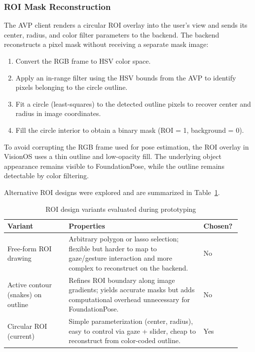 \subsubsection{ROI Mask Reconstruction}

The AVP client renders a circular ROI overlay into the user’s view and sends its center, radius, and color filter parameters to the backend. The backend reconstructs a pixel mask without receiving a separate mask image:

\begin{enumerate}
    \item Convert the RGB frame to HSV color space.
    \item Apply an in-range filter using the HSV bounds from the AVP to identify pixels belonging to the circle outline.
    \item Fit a circle (least-squares) to the detected outline pixels to recover center and radius in image coordinates.
    \item Fill the circle interior to obtain a binary mask (ROI = 1, background = 0).
\end{enumerate}

To avoid corrupting the RGB frame used for pose estimation, the ROI overlay in VisionOS uses a thin outline and low-opacity fill. The underlying object appearance remains visible to FoundationPose, while the outline remains detectable by color filtering.

Alternative ROI designs were explored and are summarized in Table~\ref{tab:roi-variants}.

\begin{table}[H]
    \centering
    \caption{ROI design variants evaluated during prototyping}
    \label{tab:roi-variants}
    \begin{tabular}{p{0.25\linewidth}p{0.55\linewidth}p{0.14\linewidth}}
        \toprule
        \textbf{Variant} & \textbf{Properties} & \textbf{Chosen?} \\
        \midrule
        Free-form ROI drawing &
        Arbitrary polygon or lasso selection; flexible but harder to map to gaze/gesture interaction and more complex to reconstruct on the backend. & No \\
        Active contour (snakes) on outline &
        Refines ROI boundary along image gradients; yields accurate masks but adds computational overhead unnecessary for FoundationPose. & No \\
        Circular ROI (current) &
        Simple parameterization (center, radius), easy to control via gaze + slider, cheap to reconstruct from color-coded outline. & Yes \\
        \bottomrule
    \end{tabular}
\end{table}

